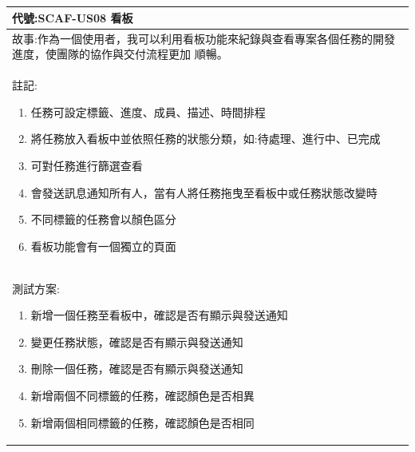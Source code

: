 \documentclass{report}
\begin{document}
\subsection*{}
\fontsize{12}{20}\selectfont
\begin{tabularx}{\textwidth}{|X|}
  \hline
  代號:SCAF-US08 看板 \\
  \hline
  故事:作為一個使用者，我可以利用看板功能來紀錄與查看專案各個任務的開發進度，使團隊的協作與交付流程更加
  順暢。 \\
  \hline
  註記:
  \begin{enumerate}
    \item 任務可設定標籤、進度、成員、描述、時間排程
    \item 將任務放入看板中並依照任務的狀態分類，如:待處理、進行中、已完成
    \item 可對任務進行篩選查看
    \item 會發送訊息通知所有人，當有人將任務拖曳至看板中或任務狀態改變時
    \item 不同標籤的任務會以顏色區分
    \item 看板功能會有一個獨立的頁面
  \end{enumerate} \\
  \hline
  測試方案:
  \begin{enumerate}
    \item 新增一個任務至看板中，確認是否有顯示與發送通知
    \item 變更任務狀態，確認是否有顯示與發送通知
    \item 刪除一個任務，確認是否有顯示與發送通知
    \item 新增兩個不同標籤的任務，確認顏色是否相異
    \item 新增兩個相同標籤的任務，確認顏色是否相同
  \end{enumerate} \\
  \hline
\end{tabularx}
\end{document}
